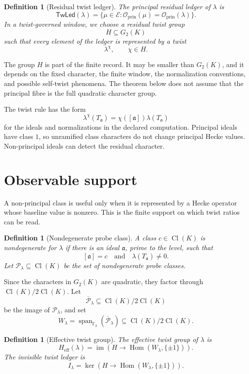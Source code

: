 \documentclass[11pt]{article}
\newtheorem{definition}[theorem]{Definition}
\DeclareMathOperator{\Hom}{Hom}
\DeclareMathOperator{\Cl}{Cl}
\DeclareMathOperator{\Span}{span}
\begin{document}
\begin{definition}[Residual twist ledger]
The principal residual ledger of \(\lambda\) is
\[
\mathsf{TwLed}(\lambda)=
\{\mu\in\mathcal E:
\mathcal O_{\mathrm{prin}}(\mu)=\mathcal O_{\mathrm{prin}}(\lambda)\}.
\]
In a twist-governed window, we choose a residual twist group
\[
H\subseteq G_2(K)
\]
such that every element of the ledger is represented by a twist
\[
\lambda^\chi,\qquad \chi\in H.
\]
\end{definition}

The group \(H\) is part of the finite record.  It may be smaller than \(G_2(K)\), and it depends on the fixed character, the finite window, the normalization conventions, and possible self-twist phenomena.  The theorem below does not assume that the principal fibre is the full quadratic character group.

The twist rule has the form
\[
\lambda^\chi(T_{\mathfrak a})
=
\chi([\mathfrak a])\lambda(T_{\mathfrak a})
\]
for the ideals and normalizations in the declared computation.  Principal ideals have class \(1\), so unramified class characters do not change principal Hecke values.  Non-principal ideals can detect the residual character.

\section{Observable support}

A non-principal class is useful only when it is represented by a Hecke operator whose baseline value is nonzero.  This is the finite support on which twist ratios can be read.

\begin{definition}[Nondegenerate probe class]
A class \(c\in\Cl(K)\) is nondegenerate for \(\lambda\) if there is an ideal \(\mathfrak a\), prime to the level, such that
\[
[\mathfrak a]=c
\quad\text{and}\quad
\lambda(T_{\mathfrak a})\neq0.
\]
Let \(\mathcal P_\lambda\subseteq\Cl(K)\) be the set of nondegenerate probe classes.
\end{definition}

Since the characters in \(G_2(K)\) are quadratic, they factor through \(\Cl(K)/2\Cl(K)\).  Let
\[
\overline{\mathcal P}_\lambda
\subseteq
\Cl(K)/2\Cl(K)
\]
be the image of \(\mathcal P_\lambda\), and set
\[
W_\lambda=
\Span_{\mathbb F_2}(\overline{\mathcal P}_\lambda)
\subseteq
\Cl(K)/2\Cl(K).
\]

\begin{definition}[Effective twist group]
The effective twist group of \(\lambda\) is
\[
H_{\mathrm{eff}}(\lambda)=
\operatorname{im}\left(
H\longrightarrow\Hom(W_\lambda,\{\pm1\})
\right).
\]
The invisible twist ledger is
\[
I_\lambda=
\ker\left(
H\longrightarrow\Hom(W_\lambda,\{\pm1\})
\right).
\]
\end{definition}
\end{document}
